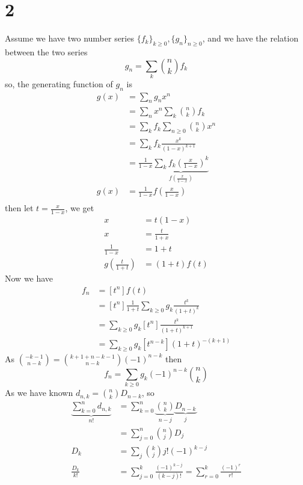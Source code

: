 \documentclass{article}
\begin{document}
\section{2}
Assume we have two number series \(\{f_k\}_{k\geq 0},\{g_n\}_{n\geq 0}\),
and we have the relation between the two series
\[
g_n=\sum_k\binom{n}{k}f_k
\]
so, the generating function of \(g_n\) is
\begin{align*}
  g(x)&=\sum_ng_nx^n \\
  &=\sum_nx^n\sum_k\binom{n}{k}f_k \\
  &=\sum_kf_k\sum_{n\geq 0}\binom{n}{k}x^n \\
  &=\sum_kf_k\frac{x^k}{(1-x)^{k+1}} \\
  &=\frac{1}{1-x}\underbrace{\sum_kf_k\left(\frac{x}{1-x}\right)^k}_{f\left(\frac{x}{1-x}\right)} \\
  g(x)&=\frac{1}{1-x}f\left(\frac{x}{1-x}\right) \\
\end{align*}
then let \(t=\frac{x}{1-x}\), we get \\
\begin{align*}
  x&=t(1-x) \\
  x&=\frac{t}{1+x}\\
  \frac{1}{1-x}&=1+t\\
  g\left(\frac{t}{1+t}\right)&=(1+t)f(t)
\end{align*}
Now we have\\
\begin{align*}
  f_n&=[t^n]f(t) \\
  &=[t^n]\frac{1}{1+t}\sum_{k\geq 0}g_k\frac{t^k}{(1+t)^k} \\
  &=\sum_{k\geq 0}g_k[t^n]\frac{t^k}{(1+t)^{k+1}} \\
  &=\sum_{k\geq 0}g_k[t^{n-k}](1+t)^{-(k+1)}
\end{align*}
As \(\binom{-k-1}{n-k}=\binom{k+1+n-k-1}{n-k}(-1)^{n-k}\) then \\
\[
f_n=\sum_{k\geq 0}g_k(-1)^{n-k}\binom{n}{k}
\]
As we have known \(d_{n,k}=\binom{n}{k}D_{n-k}\), so \\
\begin{align*}
\underbrace{\sum_{k=0}^nd_{n,k}}_{n!}&=\sum_{k=0}^n\underbrace{\binom{n}{k}}_{n-j}\underbrace{D_{n-k}}_j
\\
&=\sum_{j=0}^n\binom{n}{j}D_j \\
D_k&=\sum_j\binom{k}{j}j!(-1)^{k-j} \\
\frac{D_k}{k!}&=\sum_{j=0}^k\frac{(-1)^{k-j}}{(k-j)!}=\sum_{r=0}^k\frac{(-1)^r}{r!}
\end{align*}
\end{document}
